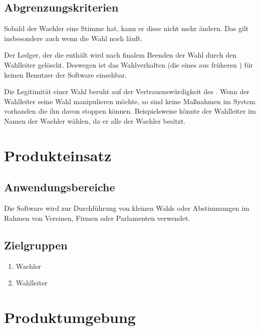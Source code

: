 \documentclass[parskip=full,11pt,twoside]{scrartcl}
\begin{document}
\subsection{Abgrenzungskriterien}
Sobald der \gls{Waehler} eine Stimme  hat, kann er diese nicht mehr ändern. Das gilt insbesondere auch wenn die \gls{Wahl} noch läuft.

Der \gls{Ledger}, der die  enthält wird nach finalem Beenden der \gls{Wahl} durch den \gls{Wahlleiter} gelöscht.
Deswegen ist das Wahlverhalten (die  eines  aus früheren ) für keinen Benutzer der Software einsehbar. 

Die Legitimität einer \gls{Wahl} beruht auf der Vertrauenswürdigkeit des . Wenn der \gls{Wahlleiter} seine \gls{Wahl} manipulieren möchte, so sind keine Maßnahmen im System vorhanden die ihn davon stoppen können. Beispielsweise könnte der \gls{Wahlleiter} im Namen der \gls{Waehler} wählen, da er alle  der \gls{Waehler} besitzt.

\section{Produkteinsatz}

\subsection{Anwendungsbereiche}
Die Software wird zur Durchführung von kleinen \glspl{Wahl} oder Abstimmungen im Rahmen von Vereinen, Firmen oder Parlamenten verwendet.

\subsection{Zielgruppen}
\begin{enumerate}
  \item \gls{Waehler}
  \item \gls{Wahlleiter}
\end{enumerate}

\section{Produktumgebung}
\end{document}
